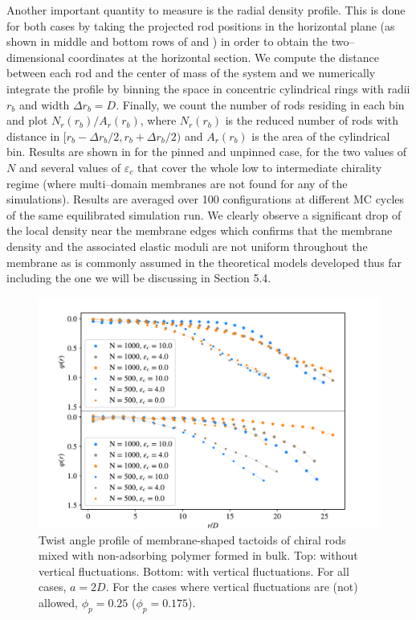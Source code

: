 Another important quantity to measure is the radial density profile. This is done for both cases by taking the projected rod positions in the horizontal plane (as shown in middle and bottom rows of  and ) in order to obtain the two--dimensional coordinates at the horizontal section. We compute the distance between each rod and the center of mass of the system and we numerically integrate the profile by binning the space in concentric cylindrical rings with radii $r_b$ and width $\Delta r_b=D$. Finally, we count the number of rods residing in each bin and plot $N_r(r_b)/A_r(r_b)$, where $N_r(r_b)$ is the reduced number of rods with distance in $[r_b - \Delta r_b/2,r_b + \Delta r_b/2)$ and $A_r(r_b)$ is the area of the cylindrical bin.
Results are shown in  for the pinned and unpinned case, for the two values of $N$ and several values of $\varepsilon_c$ that cover the whole low to intermediate chirality regime (where multi--domain membranes are not found for any of the simulations). Results are averaged over 100 configurations at different MC cycles of the same equilibrated simulation run.
We clearly observe a significant drop of the local density near the membrane edges which confirms that the membrane density and the associated elastic moduli are not uniform throughout the membrane as is commonly assumed in the theoretical models developed thus far \cite{wensink2018elastic,kang_sm2016,kaplan2010theory} including the one we will be discussing in Section 5.4.


\begin{figure}
\includegraphics[width= .9\columnwidth]{figures/chapter-5/twistprofile}
	\caption[Twist angle profile]{Twist angle profile of membrane-shaped tactoids of chiral rods mixed with non-adsorbing polymer formed in bulk. Top: without vertical fluctuations. Bottom: with vertical fluctuations. For all cases, $a = 2D$. For the cases where vertical fluctuations are (not) allowed, $\phi_p=0.25$ ($\phi_p=0.175$). } %
 \label{twangle}
\end{figure}




